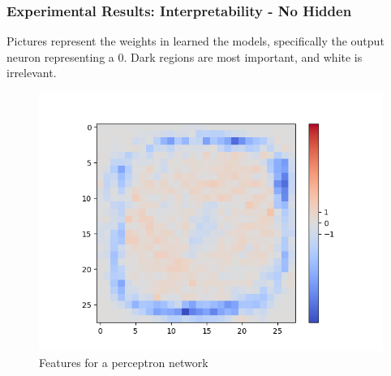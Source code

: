 \documentclass[]{beamer}
\begin{document}
\begin{frame}
\frametitle{Experimental Results: Interpretability - No Hidden}
Pictures represent the weights in learned the models, specifically the output neuron representing a 0. Dark regions are most important, and white is irrelevant.

\begin{minipage}[t]{0.4\textwidth}
\begin{figure}[H]
	\centering
	\begin{minipage}[b]{0.7\textwidth}
		\captionsetup{labelformat=empty}
		\includegraphics[width=\textwidth]{Images/Sigmoid(NO-Hidden)/Layer0-Neuron-0.png}
	\end{minipage}
	\caption{Features for a perceptron network}
	\hfill
\end{figure}
\end{minipage}
\hspace{0.1\textwidth}
\begin{minipage}[t]{0.4\textwidth}
\begin{figure}[H]
	\centering
	\begin{minipage}[b]{0.7\textwidth}
		\captionsetup{labelformat=empty}

\end{minipage}
\end{figure}
\end{minipage}
\end{frame}
\end{document}
